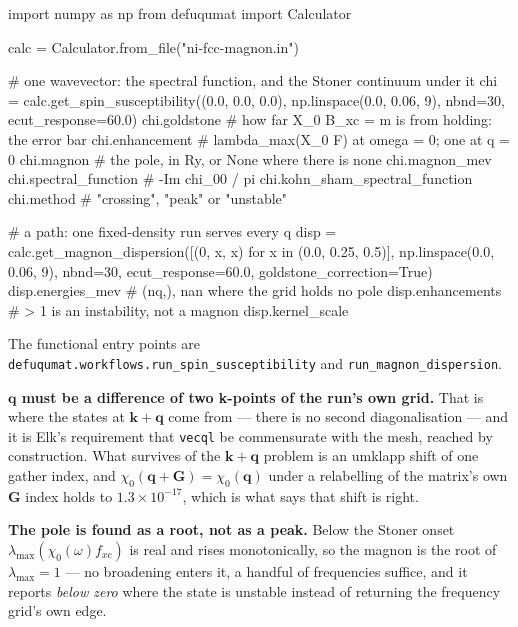 \documentclass[11pt,a4paper]{article}
\newcommand{\code}[1]{\texttt{\small #1}}
\begin{document}
\begin{pycode}
import numpy as np
from defuqumat import Calculator

calc = Calculator.from_file("ni-fcc-magnon.in")

# one wavevector: the spectral function, and the Stoner continuum under it
chi = calc.get_spin_susceptibility((0.0, 0.0, 0.0), np.linspace(0.0, 0.06, 9),
                                   nbnd=30, ecut_response=60.0)
chi.goldstone              # how far X_0 B_xc = m is from holding: the error bar
chi.enhancement            # lambda_max(X_0 F) at omega = 0; one at q = 0
chi.magnon                 # the pole, in Ry, or None where there is none
chi.magnon_mev
chi.spectral_function      # -Im chi_00 / pi
chi.kohn_sham_spectral_function
chi.method                 # "crossing", "peak" or "unstable"

# a path: one fixed-density run serves every q
disp = calc.get_magnon_dispersion([(0, x, x) for x in (0.0, 0.25, 0.5)],
                                  np.linspace(0.0, 0.06, 9),
                                  nbnd=30, ecut_response=60.0,
                                  goldstone_correction=True)
disp.energies_mev          # (nq,), nan where the grid holds no pole
disp.enhancements          # > 1 is an instability, not a magnon
disp.kernel_scale
\end{pycode}

The functional entry points are
\code{defuqumat.workflows.run\_spin\_susceptibility} and
\code{run\_magnon\_dispersion}.

\textbf{$\mathbf q$ must be a difference of two k-points of the run's own
grid.} That is where the states at $\mathbf k+\mathbf q$ come from --- there is
no second diagonalisation --- and it is Elk's requirement that \code{vecql} be
commensurate with the mesh, reached by construction. What survives of the
$\mathbf k+\mathbf q$ problem is an umklapp shift of one gather index, and
$\chi_0(\mathbf q + \mathbf G) = \chi_0(\mathbf q)$ under a relabelling of the
matrix's own $\mathbf G$ index holds to $1.3\times10^{-17}$, which is what says
that shift is right.

\textbf{The pole is found as a root, not as a peak.} Below the Stoner onset
$\lambda_{\max}(\chi_0(\omega) f_{xc})$ is real and rises monotonically, so the
magnon is the root of $\lambda_{\max} = 1$ --- no broadening enters it, a
handful of frequencies suffice, and it reports \emph{below zero} where the
state is unstable instead of returning the frequency grid's own edge.
\end{document}
